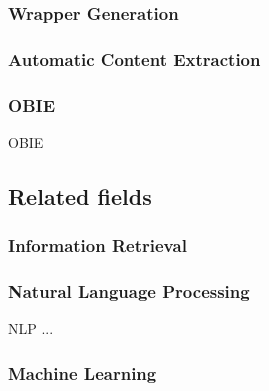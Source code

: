 \subsubsection{Wrapper Generation}

\subsubsection{Automatic Content Extraction}

\subsubsection{\acrlong{OBIE}}
\gls{OBIE}

\newpage
\subsection{Related fields}

\subsubsection{Information Retrieval}

\subsubsection{Natural Language Processing}
\gls{NLP} ...

\subsubsection{Machine Learning}
